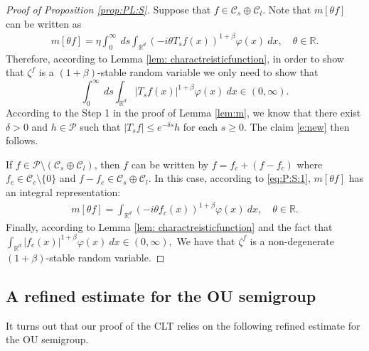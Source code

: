 \documentclass[12pt,a4paper]{amsart}
\theoremstyle{plain}
\theoremstyle{definition}
\numberwithin{equation}{section}
\begin{document}
\begin{proof}[Proof of Proposition \ref{prop:PL:S}]
	Suppose that $f\in \mathcal C_s \oplus \mathcal C_l$.
Note that $m[\theta f]$ can be written as
  \begin{align}
    \label{eq:PL:S:1}
    m[\theta f]
    = \eta \int_0^{\infty}~ds\int_{\mathbb R^d} (-i\theta T_s f(x))^{1+\beta} \varphi(x)~dx,
    \quad \theta \in \mathbb R.
  \end{align}
	Therefore, according to Lemma \ref{lem: charactreisticfunction}, in order to show that $\zeta^f$ is a $(1+\beta)$-stable random variable we only need to show that
\begin{equation}\label{e:new}
    \int_0^{\infty}~ds\int_{\mathbb R^d} | T_{s} f(x)|^{1+\beta} \varphi(x)~dx
    \in (0, \infty).
\end{equation}
  According to the Step 1 in the proof of Lemma \ref{lem:m}, we know that there exist $\delta> 0$ and $h \in \mathcal P$ such that $|T_sf| \leq e^{- \delta s} h$ for each $s\geq 0$.
The claim \eqref{e:new} then follows.

  If $f \in \mathcal P \setminus (\mathcal C_s \oplus \mathcal C_l)$, then $f$ can be written by $f = f_c +(f - f_c)$ where $f_c \in \mathcal C_c\setminus\{0\}$ and $f - f_c \in \mathcal C_s \oplus \mathcal C_l$.
  In this case, according to \eqref{eq:P:S:1}, $m[\theta f]$ has an integral representation:
  \begin{align}
    \label{eq:PL:S:2}
    m[\theta f]
    = \int_{\mathbb R^d} (-i\theta f_c(x))^{1+\beta} \varphi(x) ~dx,
    \quad \theta \in \mathbb R.
  \end{align}
  Finally, according to Lemma \ref{lem: charactreisticfunction} and the fact that
 $
    \int_{\mathbb R^d} | f_c(x)|^{1+\beta} \varphi(x)~dx
    \in (0, \infty),
  $
  We have that $\zeta^f$ is a non-degenerate $(1+\beta)$-stable random variable.
\end{proof}

\subsection{A refined estimate for the OU semigroup}\label{sc:refined}
It turns out that our proof of the CLT relies on the following refined estimate for the OU semigroup.
\end{document}
